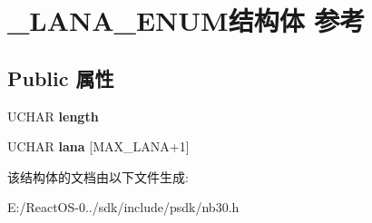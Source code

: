 \hypertarget{struct___l_a_n_a___e_n_u_m}{}\section{\+\_\+\+L\+A\+N\+A\+\_\+\+E\+N\+U\+M结构体 参考}
\label{struct___l_a_n_a___e_n_u_m}
\subsection*{Public 属性}
\begin{DoxyCompactItemize}
\item 
\mbox{\label{struct___l_a_n_a___e_n_u_m_a7af3f534e030b08fad6a8a2232d60927}} 
U\+C\+H\+AR {\bfseries length}
\item 
\mbox{\label{struct___l_a_n_a___e_n_u_m_a4c3398d9d3e3392f4aafdbd33e02b0c3}} 
U\+C\+H\+AR {\bfseries lana} \mbox{[}M\+A\+X\+\_\+\+L\+A\+NA+1\mbox{]}
\end{DoxyCompactItemize}


该结构体的文档由以下文件生成\+:\begin{DoxyCompactItemize}
\item 
E\+:/\+React\+O\+S-\/0../sdk/include/psdk/nb30.\+h\end{DoxyCompactItemize}
